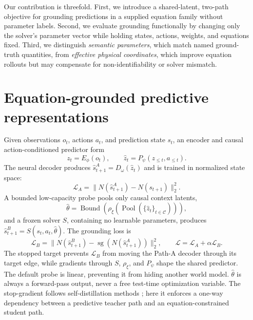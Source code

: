 \documentclass{article}
\newcommand{\patha}{\hat{s}^{A}_{t+1}}
\newcommand{\pathb}{\hat{s}^{B}_{t+1}}
\begin{document}
Our contribution is threefold. First, we introduce a shared-latent, two-path objective for grounding predictions in a supplied equation family without parameter labels. Second, we evaluate grounding functionally by changing only the solver's parameter vector while holding states, actions, weights, and equations fixed. Third, we distinguish \emph{semantic parameters}, which match named ground-truth quantities, from \emph{effective physical coordinates}, which improve equation rollouts but may compensate for non-identifiability or solver mismatch.



\section{Equation-grounded predictive representations}

Given observations $o_t$, actions $a_t$, and prediction state $s_t$, an encoder and causal action-conditioned predictor form
\begin{equation}
z_t=E_\phi(o_t), \qquad \hat z_t=P_\psi(z_{\leq t},a_{\leq t}).
\end{equation}
The neural decoder produces $\patha=D_\omega(\hat z_t)$ and is trained in normalized state space:
\begin{equation}
\mathcal L_A=\|N(\patha)-N(s_{t+1})\|_2^2.
\end{equation}
A bounded low-capacity probe pools only causal context latents,
\begin{equation}
\hat\theta=\operatorname{Bound}\!\left(\rho_\xi(\operatorname{Pool}(\{\hat z_t\}_{t\in\mathcal C}))\right),
\end{equation}
and a frozen solver $S$, containing no learnable parameters, produces $\pathb=S(s_t,a_t,\hat\theta)$. The grounding loss is
\begin{equation}
\mathcal L_B=\|N(\pathb)-\operatorname{sg}(N(\patha))\|_2^2,
\label{eq:loss}
\qquad \mathcal L=\mathcal L_A+\alpha\mathcal L_B.
\end{equation}
The stopped target prevents $\mathcal L_B$ from moving the Path-A decoder through its target edge, while gradients through $S$, $\rho_\xi$, and $P_\psi$ shape the shared predictor. The default probe is linear, preventing it from hiding another world model. $\hat\theta$ is always a forward-pass output, never a free test-time optimization variable. The stop-gradient follows self-distillation methods \citep{hinton2015distillation,caron2021dino,grill2020byol}; here it enforces a one-way dependency between a predictive teacher path and an equation-constrained student path.
\end{document}
